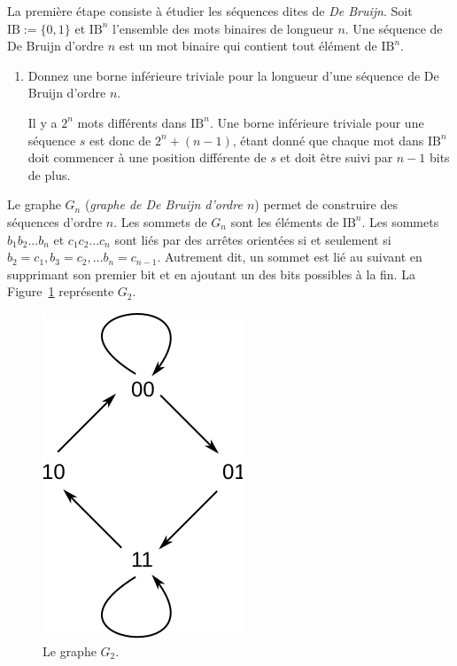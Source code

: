 \documentclass[11pt]{article}
\def\bool{\mathrm{I\!B}}
\begin{document}
La première étape consiste à étudier les séquences dites de \emph{De Bruijn}.
Soit $\bool:=\{0,1\}$ et $\bool^n$ l'ensemble des mots binaires de longueur $n$.
Une séquence de De Bruijn d'ordre $n$ est un mot binaire qui contient
tout élément de $\bool^n$.

\begin{enumerate}
\item
 Donnez une borne inférieure triviale pour la longueur d'une séquence
 de De Bruijn d'ordre $n$.

\begin{solution}
Il y a $2^n$ mots différents dans $\bool^n$.
Une borne inférieure triviale pour une séquence $s$ est donc
de $2^n+(n-1)$, étant donné que chaque mot dans $\bool^n$
doit commencer à une position différente de $s$ et doit être suivi
par $n-1$ bits de plus.
\end{solution}
\end{enumerate}

Le graphe $G_n$ (\emph{graphe de De Bruijn d'ordre $n$})
permet de construire des séquences d'ordre $n$.
Les sommets de $G_n$ sont les éléments de $\bool^n$.
Les sommets $b_1b_2...b_n$ et $c_1c_2...c_n$ sont liés par des
arrêtes orientées si et seulement si $b_2=c_1,b_3=c_2,...b_n=c_{n-1}$.
Autrement dit, un sommet est lié au suivant en
supprimant son premier bit et en ajoutant un des bits possibles à la fin.
La Figure~\ref{DeBruijnOrdre2} représente $G_2$.

\begin{figure}[h]
 \centering
 \includegraphics{order-2}
 \caption{\label{DeBruijnOrdre2}Le graphe $G_2$.}
\end{figure}
\end{document}
